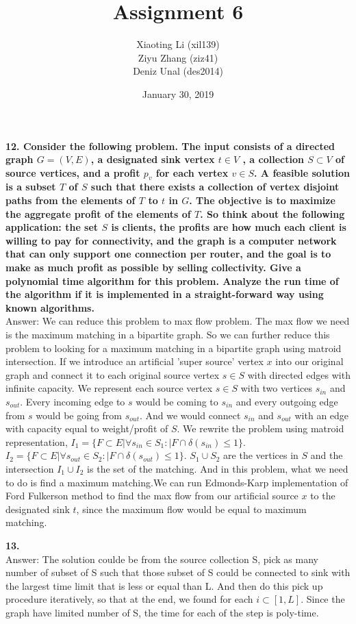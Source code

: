 \documentclass{article}
\title{Assignment 6}
\author{Xiaoting Li (xil139) \\
Ziyu Zhang (ziz41) \\
Deniz Unal (des2014)}
\date{January 30, 2019}
\begin{document}
\maketitle

\noindent
\textbf{12. Consider the following problem. The input consists of a directed graph $G = (V, E)$, a designated sink vertex $t \in V$ , a collection $S \subset V$ of source vertices, and a profit $p_v$ for each vertex $v \in S$. A feasible solution is a subset $T$ of $S$ such that there exists a collection of vertex disjoint paths from the elements of $T$ to $t$ in $G$. The objective is to maximize the aggregate profit of the elements of $T$. So think about the following application: the set $S$ is clients, the profits are how much each client is willing to pay for connectivity, and the graph is a computer network that can only support one connection per router, and the goal is to make as much profit as possible by selling collectivity. Give a polynomial time algorithm for this problem. Analyze the run time of the algorithm if it is implemented in a straight-forward way using known algorithms.} \\ \newline
\noindent
Answer: We can reduce this problem to max flow problem. The max flow we need is the maximum matching in a bipartite graph. So we can further reduce this problem to looking for a maximum matching in a bipartite graph using matroid intersection. If we introduce an artificial 'super source' vertex $x$ into our original graph and connect it to each original source vertex $s \in S$ with  directed edges with infinite capacity. We represent each source vertex $s \in S$ with two vertices $s_{in}$ and $s_{out}$. Every incoming edge to $s$ would be coming to $s_{in}$  and every outgoing edge from $s$ would be going from $s_{out}$. And we would connect $s_{in}$ and $s_{out}$ with an edge with capacity equal to weight/profit of $S$. We rewrite the problem using matroid representation, $I_{1} = \{F\subset E | \forall s_{in} \in S_1: |F \cap \delta(s_{in})\leq 1\}$. $I_{2} = \{F\subset E | \forall s_{out} \in S_2: |F \cap \delta(s_{out})\leq 1\}$. $S_1\cup S_2$ are the vertices in $S$ and the intersection $I_{1}\cup I_{2}$ is the set of the matching. And in this problem, what we need to do is find a maximum matching.We can run Edmonds-Karp implementation of Ford Fulkerson method to find the max flow from our artificial source $x$ to the designated sink $t$, since the maximum flow would be equal to maximum matching.


\noindent
\textbf{13.}\\ \newline
\noindent
Answer: The solution coulde be from the source collection S, pick as many number of subset of S such that those subset of S could be connected to sink with the largest time limit that is less or equal than L. And then do this pick up procedure iteratively, so that at the end, we found for each $i \subset [1,L]$. Since the graph have limited number of S, the time for each of the step is poly-time.
\end{document}

